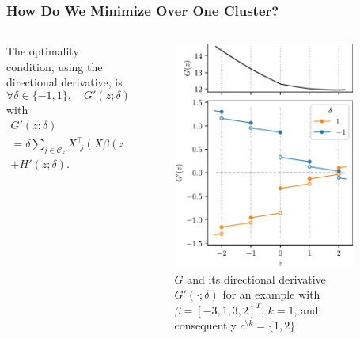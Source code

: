 \documentclass[10pt]{beamer}
\begin{document}
\begin{frame}
  \frametitle{How Do We Minimize Over One Cluster?}

  \begin{columns}
    \begin{column}{0.45\textwidth}
      The optimality condition, using the directional derivative, is
      \[
        \forall \delta \in \{-1, 1\}, \quad G'(z; \delta) \geq 0,
      \]
      with
      \[
        \begin{multlined}
          G'(z; \delta)  \\= \delta \sum_{j \in \mathcal{C}_k} X_{:j}^\top(X\beta(z) - y) \\
          + H'(z; \delta).
        \end{multlined}
      \]
    \end{column}
    \begin{column}{0.45\textwidth}
      \begin{figure}
        \centering
        \includegraphics[width=0.9\textwidth]{figures/paper5-directional-derivative.pdf}
        \caption{%
        \(G\) and its directional derivative \(G'( \cdot ; \delta)\) for
        an example with \(\beta = [-3, 1, 3, 2]^T\), \(k = 1\), and consequently
        \(c^{\setminus k} = \{1, 2\}\).
        }
      \end{figure}
    \end{column}
  \end{columns}
\end{frame}
\end{document}
